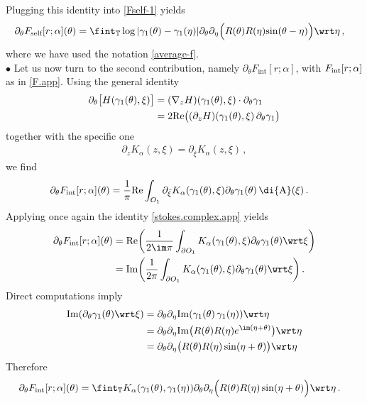 \documentclass[a4paper,reqno,10pt]{article}
\newcommand{\pa}{\partial}
\newcommand{\wrta}{\,\di {\rm A}}
\begin{document}
Plugging this identity into \eqref{Fself-1} yields
\begin{align}\label{Fself-01}
	 	\partial_\theta F_{\textnormal{self}}[r;\alpha](\theta)
&= \fint_{\mathbb{T}} \log |  \gamma_1(\theta) -\gamma_1(\eta) | \partial_\theta\partial_\eta \Big(R(\theta) R(\eta) {\sin( \theta-\eta)} \Big) \wrt \eta\,,
\end{align}
where we have used the notation \eqref{average-f}.
\\[1mm]
\noindent $\bullet$
Let us now turn to the second contribution, namely $\partial_\theta F_{\mathrm{int}}[r;\alpha]$, with $F_{\rm int}[r;\alpha]$ as in \eqref{F.app}.
Using the general  identity
\begin{align}\label{diff-gener}
 \partial_\theta\big[ H(\gamma_1(\theta),\xi)\big]&=(\nabla_z H)(\gamma_1(\theta),\xi)\cdot\partial_\theta\gamma_1 \\
&=2{\rm Re}\big( (\partial_z H)(\gamma_1(\theta),\xi)\,\partial_\theta\gamma_1\big) 
\end{align}
together with the specific one  
\begin{align}\label{specific-K}
\pa_{z} K_\alpha(z,\xi) = \pa_{\bar \xi} K_\alpha(z,\xi)\,,
\end{align}
we find
\begin{align*}
\partial_\theta F_{\textnormal{int}}[r;\alpha](\theta)&=\frac{1}{\pi} {\rm Re}\int_{O_{1}} \pa_{\bar \xi} K_\alpha(\gamma_1(\theta),\xi) \partial_\theta\gamma_1(\theta) \wrta(\xi) \,.
    \end{align*}
Applying once again the identity \eqref{stokes.complex.app} yields
\begin{align*}
\partial_\theta F_{\textnormal{int}}[r;\alpha](\theta)&= {\rm Re}\bigg(\frac{1}{2\im \pi} \int_{\partial O_{1}}  K_\alpha(\gamma_1(\theta),\xi) \partial_\theta\gamma_1(\theta) \wrt \xi\bigg)\\
&= {\rm Im}\bigg(\frac{1}{2\pi} \int_{\partial O_{1}}  K_\alpha(\gamma_1(\theta),\xi) \partial_\theta\gamma_1(\theta) \wrt \xi\bigg)\,.
    \end{align*}
    Direct computations imply
    \begin{align*}
{\rm Im}({\partial_\theta\gamma_1(\theta)} \wrt \xi)&=\partial_\theta\partial_\eta {\rm Im}({\gamma_1(\theta)}\,\gamma_1(\eta) ) \wrt \eta\\
&=\partial_\theta\partial_\eta {\rm Im}\big(R(\theta) R(\eta) e^{\im (\eta+\theta)} \big) \wrt \eta\\
&=\partial_\theta\partial_\eta \big(R(\theta) R(\eta) \sin( \eta+\theta) \big)\wrt \eta
\end{align*}
Therefore
\begin{align}
\partial_\theta F_{\textnormal{int}}[r;\alpha](\theta)&= \fint_{\mathbb{T}}  K_\alpha(\gamma_1(\theta),\gamma_1(\eta)) \partial_\theta\partial_\eta \Big(R(\theta) R(\eta) \sin( \eta+\theta) \Big)\wrt \eta\,. \label{F.int-01}
    \end{align}
    
\end{document}
